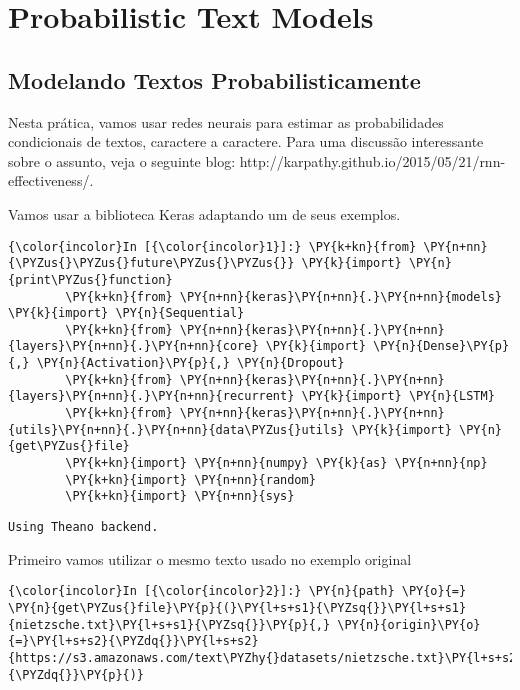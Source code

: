 \chapter{Probabilistic Text Models}

    
    

    
    \section{Modelando Textos
Probabilisticamente}\label{modelando-textos-probabilisticamente}

Nesta prática, vamos usar redes neurais para estimar as probabilidades
condicionais de textos, caractere a caractere. Para uma discussão
interessante sobre o assunto, veja o seguinte blog:
http://karpathy.github.io/2015/05/21/rnn-effectiveness/.

Vamos usar a biblioteca Keras adaptando um de seus exemplos.

    \begin{Verbatim}[commandchars=\\\{\}]
{\color{incolor}In [{\color{incolor}1}]:} \PY{k+kn}{from} \PY{n+nn}{\PYZus{}\PYZus{}future\PYZus{}\PYZus{}} \PY{k}{import} \PY{n}{print\PYZus{}function}
        \PY{k+kn}{from} \PY{n+nn}{keras}\PY{n+nn}{.}\PY{n+nn}{models} \PY{k}{import} \PY{n}{Sequential}
        \PY{k+kn}{from} \PY{n+nn}{keras}\PY{n+nn}{.}\PY{n+nn}{layers}\PY{n+nn}{.}\PY{n+nn}{core} \PY{k}{import} \PY{n}{Dense}\PY{p}{,} \PY{n}{Activation}\PY{p}{,} \PY{n}{Dropout}
        \PY{k+kn}{from} \PY{n+nn}{keras}\PY{n+nn}{.}\PY{n+nn}{layers}\PY{n+nn}{.}\PY{n+nn}{recurrent} \PY{k}{import} \PY{n}{LSTM}
        \PY{k+kn}{from} \PY{n+nn}{keras}\PY{n+nn}{.}\PY{n+nn}{utils}\PY{n+nn}{.}\PY{n+nn}{data\PYZus{}utils} \PY{k}{import} \PY{n}{get\PYZus{}file}
        \PY{k+kn}{import} \PY{n+nn}{numpy} \PY{k}{as} \PY{n+nn}{np}
        \PY{k+kn}{import} \PY{n+nn}{random}
        \PY{k+kn}{import} \PY{n+nn}{sys}
\end{Verbatim}

    \begin{Verbatim}[commandchars=\\\{\}]
Using Theano backend.

    \end{Verbatim}

    Primeiro vamos utilizar o mesmo texto usado no exemplo original

    \begin{Verbatim}[commandchars=\\\{\}]
{\color{incolor}In [{\color{incolor}2}]:} \PY{n}{path} \PY{o}{=} \PY{n}{get\PYZus{}file}\PY{p}{(}\PY{l+s+s1}{\PYZsq{}}\PY{l+s+s1}{nietzsche.txt}\PY{l+s+s1}{\PYZsq{}}\PY{p}{,} \PY{n}{origin}\PY{o}{=}\PY{l+s+s2}{\PYZdq{}}\PY{l+s+s2}{https://s3.amazonaws.com/text\PYZhy{}datasets/nietzsche.txt}\PY{l+s+s2}{\PYZdq{}}\PY{p}{)}
\end{Verbatim}

